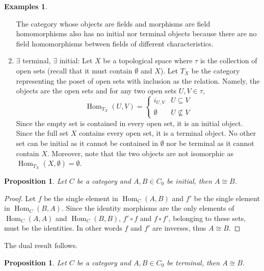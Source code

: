 \documentclass{article}
\newtheorem{prop}[thm]{Proposition}
\theoremstyle{definition}
\newtheorem{exmps}[thm]{Examples}
\theoremstyle{remark}
\DeclareMathOperator{\Hom}{Hom}
\begin{document}
\begin{exmps}
\begin{enumerate}
		The category whose objects are fields and morphisms are field homomorphisms also has no initial nor terminal objects because there are no field homomorphisms between fields of different characteristics.
		\item $\exists$ terminal, $\exists$ initial: Let $X$ be a topological space where $\tau$ is the collection of open sets (recall that it must contain $\emptyset$ and $X$). Let $T_X$ be the category representing the poset of open sets with inclusion as the relation. Namely, the objects are the open sets and for any two open sets $U, V \in \tau$, 
		\[\Hom_{T_X}(U,V) = \begin{cases}i_{U,V} & U \subseteq V\\ \emptyset & U \not\subseteq V\end{cases}\]
		Since the empty set is contained in every open set, it is an initial object. Since the full set $X$ contains every open set, it is a terminal object. No other set can be initial as it cannot be contained in $\emptyset$ nor be terminal as it cannot contain $X$. Moreover, note that the two objects are  not isomorphic as $\Hom_{T_X}(X, \emptyset) = \emptyset$.
	\end{enumerate}
\end{exmps}
\begin{prop}
	Let $C$ be a category and $A,B\in C_0$ be initial, then $A \cong B$.
\end{prop}
\begin{proof}
	Let $f$ be the single element in $\Hom_C(A,B)$ and $f'$ be the single element in $\Hom_C(B,A)$. Since the identity morphisms are the only elements of $\Hom_C(A,A)$ and $\Hom_C(B,B)$, $f' \circ f$ and $f\circ f'$, belonging to these sets, must be the identities. In other words $f$ and $f'$ are inverses, thus $A \cong B$. 
\end{proof}
The dual result follows.
\begin{prop}
	Let $C$ be a category and $A,B \in C_0$ be terminal, then $A \cong B$.
\end{prop}
\end{document}
